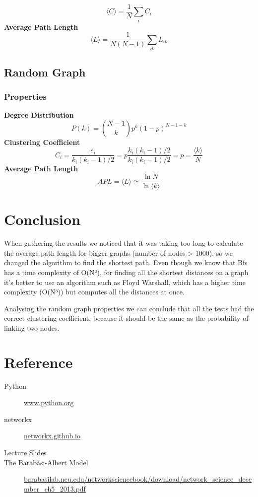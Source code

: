 \documentclass[a4paper,titlepage,11pt]{article}
\begin{document}
\[
  \langle C\rangle = \frac{1}{N}\sum_{i}{C_i}
\]
\textbf{Average Path Length}
\[
  \langle L\rangle = \frac{1}{N(N-1)}\sum_{ik}{L_{ik}}
\]

\subsection{Random Graph}


\subsubsection{Properties}
\textbf{Degree Distribution}
\[
  P(k) = {{N-1}\choose{k}} p^{k}(1-p)^{N-1-k}
\]
\textbf{Clustering Coefficient}
\[
  C_i = \frac{e_i}{k_i(k_i-1)/2} = p \frac{k_i(k_i-1)/2}{k_i(k_i-1)/2} = p = \frac{\langle k\rangle}{N}
\]
\textbf{Average Path Length}
\[
  APL = \langle L\rangle \simeq \frac{\ln{N}}{\ln{\langle k\rangle}}
\]

\section{Conclusion}
When gathering the results we noticed that it was taking too long to calculate the average path length for bigger graphs (number of nodes > 1000), so we changed the algorithm to find the shortest path. Even though we know that Bfs has a time complexity of O(N²), for finding all the shortest distances on a graph it's better to use an algorithm such as Floyd Warshall, which has a higher time complexity (O(N³)) but computes all the distances at once.

Analysing the random graph properties we can conclude that all the tests had the correct clustering coefficient, because it should be the same as the probability of linking two nodes.

\section{Reference}
\begin{description}
  \item[Python] \href{https://www.python.org}{www.python.org}
  \item[networkx] \href{https://networkx.github.io}{networkx.github.io}
  \item[Lecture Slides]
  \item[The Barabási-Albert Model] \href{http://barabasilab.neu.edu/networksciencebook/download/network_science_december_ch5_2013.pdf}{barabasilab.neu.edu/networksciencebook/download/network\_science\_december\_ch5\_2013.pdf}
\end{description}
\end{document}
